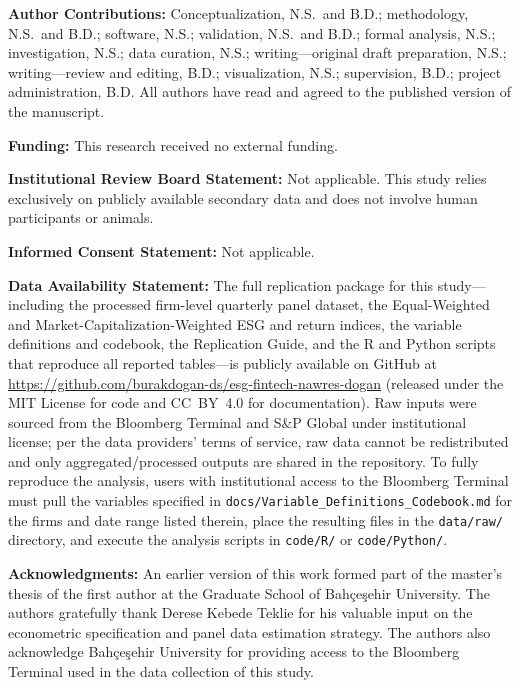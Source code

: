 \documentclass[12pt]{article}
\begin{document}
\vspace{0.6em}
\noindent\textbf{Author Contributions:} Conceptualization, N.S.\ and B.D.; methodology, N.S.\ and B.D.; software, N.S.; validation, N.S.\ and B.D.; formal analysis, N.S.; investigation, N.S.; data curation, N.S.; writing---original draft preparation, N.S.; writing---review and editing, B.D.; visualization, N.S.; supervision, B.D.; project administration, B.D. All authors have read and agreed to the published version of the manuscript.

\medskip
\noindent\textbf{Funding:} This research received no external funding.

\medskip
\noindent\textbf{Institutional Review Board Statement:} Not applicable. This study relies exclusively on publicly available secondary data and does not involve human participants or animals.

\medskip
\noindent\textbf{Informed Consent Statement:} Not applicable.

\medskip
\noindent\textbf{Data Availability Statement:} The full replication package for this study---including the processed firm-level quarterly panel dataset, the Equal-Weighted and Market-Capitalization-Weighted ESG and return indices, the variable definitions and codebook, the Replication Guide, and the R and Python scripts that reproduce all reported tables---is publicly available on GitHub at \url{https://github.com/burakdogan-ds/esg-fintech-nawres-dogan} (released under the MIT License for code and CC~BY~4.0 for documentation). Raw inputs were sourced from the Bloomberg Terminal and S\&P Global under institutional license; per the data providers' terms of service, raw data cannot be redistributed and only aggregated/processed outputs are shared in the repository. To fully reproduce the analysis, users with institutional access to the Bloomberg Terminal must pull the variables specified in \texttt{docs/Variable\_Definitions\_Codebook.md} for the firms and date range listed therein, place the resulting files in the \texttt{data/raw/} directory, and execute the analysis scripts in \texttt{code/R/} or \texttt{code/Python/}.

\medskip
\noindent\textbf{Acknowledgments:} An earlier version of this work formed part of the master's thesis of the first author at the Graduate School of Bahçeşehir University. The authors gratefully thank Derese Kebede Teklie for his valuable input on the econometric specification and panel data estimation strategy. The authors also acknowledge Bahçeşehir University for providing access to the Bloomberg Terminal used in the data collection of this study.
\end{document}
